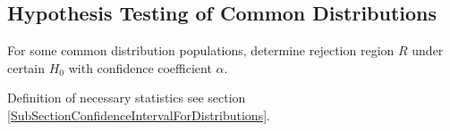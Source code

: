         



\subsection{Hypothesis Testing of Common Distributions}\label{SubSectionHypothesisTestingOfCommonDistributions}
    For some common distribution populations, determine rejection region $R$ under certain $H_0$ with confidence coefficient $\alpha$.

    Definition of necessary statistics see section {\autoref{SubSectionConfidenceIntervalForDistributions}}.

